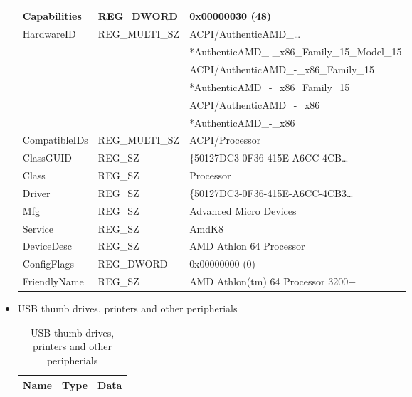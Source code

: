 \documentclass[5pt]{article}
\begin{document}
\begin{itemize}
\begin{table}[ht]
\begin{tabular}{|l|l|l|}
  Capabilities & REG\_DWORD & 0x00000030 (48) \\
  \hline
HardwareID & REG\_MULTI\_SZ & ACPI/AuthenticAMD\_\ldots\\
\hline
& & *AuthenticAMD\_-\_x86\_Family\_15\_Model\_15 \\
\hline
&  & ACPI/AuthenticAMD\_-\_x86\_Family\_15 \\
\hline
& &  *AuthenticAMD\_-\_x86\_Family\_15 \\
\hline 	
& & ACPI/AuthenticAMD\_-\_x86 \\
\hline 	
& &	*AuthenticAMD\_-\_x86 \\
\hline
CompatibleIDs &	REG\_MULTI\_SZ & ACPI/Processor\\
\hline
ClassGUID &	REG\_SZ & \{50127DC3-0F36-415E-A6CC-4CB\ldots\\
\hline
Class &	REG\_SZ & Processor \\
\hline
Driver & REG\_SZ & \{50127DC3-0F36-415E-A6CC-4CB3\ldots\\
\hline 	
Mfg & REG\_SZ &	Advanced Micro Devices\\
\hline 	
Service & REG\_SZ & AmdK8\\
\hline 	
DeviceDesc & REG\_SZ & AMD Athlon 64 Processor\\
\hline
ConfigFlags & REG\_DWORD &  0x00000000 (0)\\
\hline
FriendlyName & REG\_SZ & AMD Athlon(tm) 64 Processor 3200+\\
\hline  
  
  \end{tabular}
  \label{tab:hwConfTab}
\end{table}

 


\newpage


\item USB thumb drives, printers and other peripherials
\begin{table}[ht]
  \centering
  \caption{USB thumb drives, printers and other peripherials}
  \begin{tabular}{|l|l|l|}
  \hline
  Name & Type & Data\\
  \hline
  \hline
  

\end{tabular}
\end{table}
\end{itemize}
\end{document}
